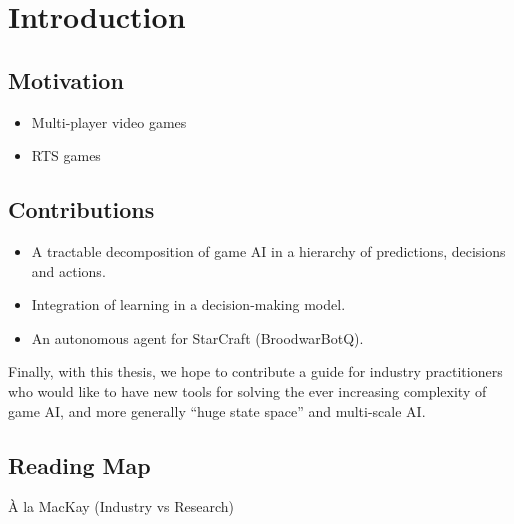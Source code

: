\chapter{Introduction}

\adjustmtc
\chaptertoc

\section{Motivation}

\begin{itemize}
\item Multi-player video games
\item RTS games
\end{itemize}

\section{Contributions}

\begin{itemize}
\item A tractable decomposition of game AI in a hierarchy of predictions, decisions and actions.
\item Integration of learning in a decision-making model. 
\item An autonomous agent for StarCraft (BroodwarBotQ).
\end{itemize}

Finally, with this thesis, we hope to contribute a guide for industry practitioners who would like to have new tools for solving the ever increasing complexity of game AI, and more generally ``huge state space'' and multi-scale AI.




\section{Reading Map}

À la MacKay (Industry vs Research)


